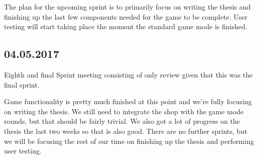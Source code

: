 The plan for the upcoming sprint is to primarily focus on writing the thesis and finishing up the last few components needed for the game to be complete. User testing will start taking place the moment the standard game mode is finished.

\subsection*{04.05.2017}
Eighth and final Sprint meeting consisting of only review given that this was the final sprint. 

Game functionality is pretty much finished at this point and we're fully focusing on writing the thesis. We still need to integrate the shop with the game mode rounds, but that should be fairly trivial. We also got a lot of progress on the thesis the last two weeks so that is also good. There are no further sprints, but we will be focusing the rest of our time on finishing up the thesis and performing user testing.  